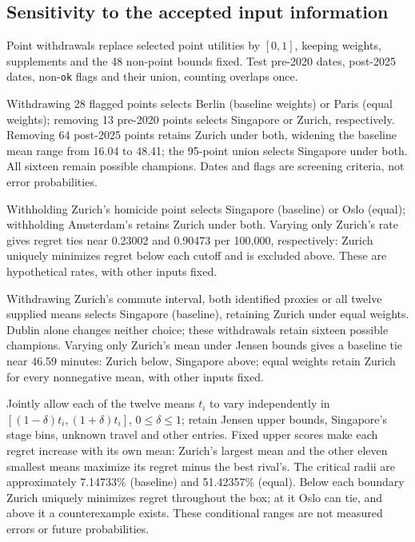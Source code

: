 \subsection{Sensitivity to the accepted input information}\label{sec:sourcepolicy}
Point withdrawals replace selected point utilities by $[0,1]$, keeping weights,
supplements and the 48 non-point bounds fixed. Test pre-2020 dates, post-2025
dates, non-\texttt{ok} flags and their union, counting overlaps once.



Withdrawing 28 flagged points selects Berlin (baseline weights) or Paris
(equal weights); removing 13 pre-2020 points selects Singapore or Zurich,
respectively. Removing 64 post-2025 points retains Zurich under both,
widening the baseline mean range from 16.04 to 48.41; the 95-point union
selects Singapore under both. All sixteen remain possible champions.
Dates and flags are screening criteria, not error probabilities.

Withholding Zurich's homicide point selects Singapore (baseline) or Oslo
(equal); withholding Amsterdam's retains Zurich under both. Varying only
Zurich's rate gives regret ties near 0.23002 and 0.90473 per 100,000,
respectively: Zurich uniquely minimizes regret below each cutoff and is
excluded above. These are hypothetical rates, with other inputs fixed.

Withdrawing Zurich's commute interval, both identified proxies or all twelve
supplied means selects Singapore (baseline), retaining Zurich under equal
weights. Dublin alone changes neither choice; these withdrawals retain sixteen
possible champions. Varying only Zurich's mean under Jensen bounds gives a baseline tie
near 46.59 minutes: Zurich below, Singapore above; equal weights retain
Zurich for every nonnegative mean, with other inputs fixed.

Jointly allow each of the twelve means $t_i$ to vary independently in
$[(1-\delta)t_i,(1+\delta)t_i]$, $0\leq\delta\leq1$; retain Jensen upper bounds,
Singapore's stage bins, unknown travel and other entries. Fixed upper scores
make each regret increase with its own mean: Zurich's largest mean and the
other eleven smallest means maximize its regret minus the best rival's.
The critical radii are approximately 7.14733\% (baseline) and 51.42357\% (equal).
Below each boundary Zurich uniquely minimizes regret throughout the box;
at it Oslo can tie, and above it a counterexample exists.
These conditional ranges are not measured errors or future probabilities.
